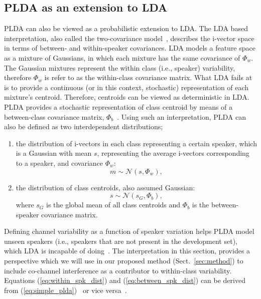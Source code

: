 \subsection{PLDA as an extension to LDA}
\label{sec:twocov}
PLDA can also be viewed as a probabilistic extension to LDA. 
The LDA based interpretation, also called the two-covariance model~\cite{niko_twocov,sizov2014unifying}, describes the i-vector space in terms of between- and within-speaker covariances. 
LDA models a feature space as a mixture of Gaussians, in which each mixture has the same covariance of $\Phi_w$. 
The Gaussian mixtures represent the within class (i.e., speaker) variability, therefore $\Phi_w$ is refer to as the within-class covariance matrix. 
What LDA fails at is to provide a continuous (or in this context, stochastic) representation of each mixture's centroid. 
Therefore, centroids can be viewed as deterministic in LDA. 
PLDA provides a stochastic representation of class centroid by means of a between-class covariance matrix, $\Phi_b$~\cite{ioffePLDA2006}. 
Using such an interpretation, PLDA can also be defined as two interdependent distributions; 
\begin{enumerate}
	\item the distribution of i-vectors in each class representing a certain speaker, which is a Gaussian with mean $s$, representing the average i-vectors corresponding to a speaker, and covariance $\Phi_w$:
	\begin{equation}
	\label{eq:within_spk_dist}
	m \sim \mathcal{N} (s,\Phi_w),
	\end{equation}
	\item the distribution of class centroids, also assumed Gaussian:
	\begin{equation}
	\label{eq:between_spk_dist}
	s \sim \mathcal{N} (s_G,\Phi_b),
	\end{equation}
	where $s_G$ is the global mean of all class centroids and $\Phi_b$ is the between-speaker covariance matrix. 
\end{enumerate}

Defining channel variability as a function of speaker variation helps PLDA model unseen speakers (i.e., speakers that are not present in the development set), which LDA is incapable of doing~\cite{ioffePLDA2006}. 
The interpretation in this section, provides a perspective which we will use in our proposed method (Sect.~\ref{sec:method}) to include co-channel interference as a contributor to within-class variability. 
Equations (\ref{eq:within_spk_dist}) and (\ref{eq:between_spk_dist}) can be derived from (\ref{eq:simple_plda})~\cite{sizov2014unifying} or vice versa~\cite{ioffePLDA2006}. 


